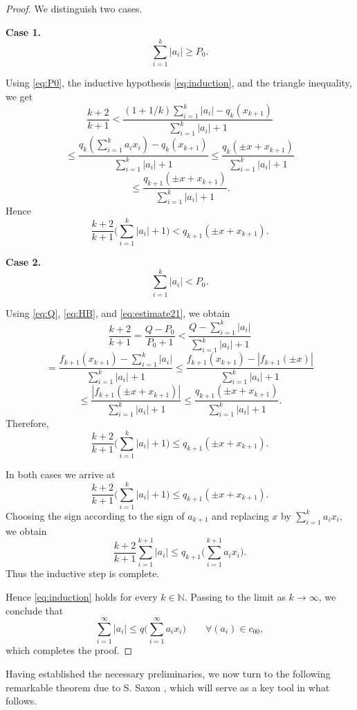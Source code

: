 \documentclass[12pt]{amsart}
\theoremstyle{plain}
\theoremstyle{definition}
\theoremstyle{remark}
\begin{document}
\begin{proof}
We distinguish two cases.

\medskip

\noindent
{\bf Case 1.}
\[
\sum_{i=1}^{k}|a_i|\ge P_0.
\]

Using \eqref{eq:P0}, the inductive hypothesis
\eqref{eq:induction}, and the triangle inequality, we get
\[
\frac{k+2}{k+1}
<
\frac{(1+1/k)\sum_{i=1}^{k}|a_i|-q_k(x_{k+1})}
     {\sum_{i=1}^{k}|a_i|+1}
\]
\[
\le
\frac{
q_k\!\left(\sum_{i=1}^{k}a_ix_i\right)-q_k(x_{k+1})
}{
\sum_{i=1}^{k}|a_i|+1
}
\le
\frac{
q_k(\pm x+x_{k+1})
}{
\sum_{i=1}^{k}|a_i|+1
}
\]
\[
\le
\frac{
q_{k+1}(\pm x+x_{k+1})
}{
\sum_{i=1}^{k}|a_i|+1
}.
\]
Hence
\begin{equation}\label{eq:case1}
\frac{k+2}{k+1}
\Big(
\sum_{i=1}^{k}|a_i|+1
\Big)
<
q_{k+1}(\pm x+x_{k+1}).
\end{equation}

\medskip

\noindent
{\bf Case 2.}
\[
\sum_{i=1}^{k}|a_i|<P_0.
\]

Using \eqref{eq:Q}, \eqref{eq:HB}, and
\eqref{eq:estimate21}, we obtain
\[
\frac{k+2}{k+1}
=
\frac{Q-P_0}{P_0+1}
<
\frac{
Q-\sum_{i=1}^{k}|a_i|
}{
\sum_{i=1}^{k}|a_i|+1
}
\]
\[
=
\frac{
f_{k+1}(x_{k+1})
-\sum_{i=1}^{k}|a_i|
}{
\sum_{i=1}^{k}|a_i|+1
}
\le
\frac{
f_{k+1}(x_{k+1})
-|f_{k+1}(\pm x)|
}{
\sum_{i=1}^{k}|a_i|+1
}
\]
\[
\le
\frac{
|f_{k+1}(\pm x+x_{k+1})|
}{
\sum_{i=1}^{k}|a_i|+1
}
\le
\frac{
q_{k+1}(\pm x+x_{k+1})
}{
\sum_{i=1}^{k}|a_i|+1
}.
\]
Therefore,
\begin{equation}\label{eq:case2}
\frac{k+2}{k+1}
\Big(
\sum_{i=1}^{k}|a_i|+1
\Big)
\le
q_{k+1}(\pm x+x_{k+1}).
\end{equation}

\medskip

In both cases we arrive at
\[
\frac{k+2}{k+1}
\Big(
\sum_{i=1}^{k}|a_i|+1
\Big)
\le
q_{k+1}(\pm x+x_{k+1}).
\]
Choosing the sign according to the sign of $a_{k+1}$ and replacing
$x$ by $\sum_{i=1}^{k}a_ix_i$, we obtain
\[
\frac{k+2}{k+1}
\sum_{i=1}^{k+1}|a_i|
\le
q_{k+1}
\Big(
\sum_{i=1}^{k+1}a_ix_i
\Big).
\]
Thus the inductive step is complete.

Hence \eqref{eq:induction} holds for every $k\in\mathbb N$. Passing to the limit as $k\to\infty$, we conclude that
\[
\sum_{i=1}^{\infty}|a_i|
\le
q\Big(\sum_{i=1}^{\infty}a_ix_i\Big)
\qquad
\forall (a_i)\in c_{00},
\]
which completes the proof.
\end{proof}
Having established the necessary preliminaries, we now turn to the following remarkable theorem due to S. Saxon \cite[Theorem~2.1]{Saxon}, which will serve as a key tool in what follows.
\end{document}
